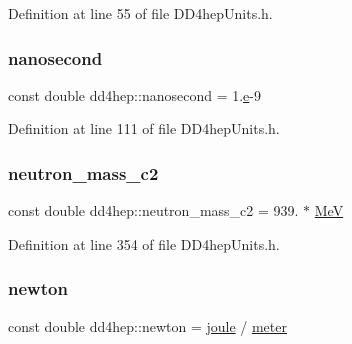 Definition at line 55 of file D\+D4hep\+Units.\+h.

\hypertarget{namespacedd4hep_acd3d49e76b85c03111a8bdcaffe4c8c7}{}\label{namespacedd4hep_acd3d49e76b85c03111a8bdcaffe4c8c7} 
\subsubsection{\texorpdfstring{nanosecond}{nanosecond}}
{\footnotesize\ttfamily const double dd4hep\+::nanosecond = 1.\hyperlink{_volumes_8cpp_a8a9a1f93e9b09afccaec215310e64142}{e}-\/9\hspace{0.3cm}{\ttfamily [static]}}



Definition at line 111 of file D\+D4hep\+Units.\+h.

\hypertarget{namespacedd4hep_a9e1f91639c11f55a3550815f9e0fca7d}{}\label{namespacedd4hep_a9e1f91639c11f55a3550815f9e0fca7d} 
\subsubsection{\texorpdfstring{neutron\+\_\+mass\+\_\+c2}{neutron\_mass\_c2}}
{\footnotesize\ttfamily const double dd4hep\+::neutron\+\_\+mass\+\_\+c2 = 939. $\ast$ \hyperlink{namespacedd4hep_a6dee62809c6ee54d2fc90671f4dc8b91}{MeV}\hspace{0.3cm}{\ttfamily [static]}}



Definition at line 354 of file D\+D4hep\+Units.\+h.

\hypertarget{namespacedd4hep_a07c189d8b327db9b4ae12f3def589851}{}\label{namespacedd4hep_a07c189d8b327db9b4ae12f3def589851} 
\subsubsection{\texorpdfstring{newton}{newton}}
{\footnotesize\ttfamily const double dd4hep\+::newton = \hyperlink{namespacedd4hep_a8cdc11c61e5f953baede59569544a324}{joule} / \hyperlink{namespacedd4hep_a46f5cf0231796af4296a307a58812b06}{meter}\hspace{0.3cm}{\ttfamily [static]}}



